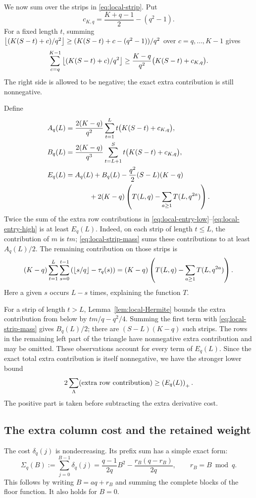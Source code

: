 We now sum over the strips in \eqref{eq:local-strip}. Put
\[
 c_{K,q}=\frac{K+q-1}{2}-(q^2-1).
\]
For a fixed length $t$, summing
$\left\lfloor (K(S-t)+c)/q^2\right\rfloor\geq(K(S-t)+c-(q^2-1))/q^2$
over $c=q,\ldots,K-1$ gives
\begin{equation}\label{eq:local-strip-mass}
 \sum_{c=q}^{K-1}\left\lfloor (K(S-t)+c)/q^2\right\rfloor
 \geq\frac{K-q}{q^2}\bigl(K(S-t)+c_{K,q}\bigr).
\end{equation}
The right side is allowed to be negative; the exact extra contribution is
still nonnegative.

Define
\begin{align*}
 A_q(L)&=\frac{2(K-q)}{q^2}\sum_{t=1}^{L}
              t\bigl(K(S-t)+c_{K,q}\bigr),\\
 B_q(L)&=\frac{2(K-q)}{q^3}\sum_{t=L+1}^{S}
              t\bigl(K(S-t)+c_{K,q}\bigr),\\
 E_q(L)&=A_q(L)+B_q(L)-\frac{q^2}{2}(S-L)(K-q)\\
 &\hspace{12mm}+2(K-q)\left(T(L,q)-\sum_{a\geq1}T(L,q^{2a})\right).
\end{align*}
Twice the sum of the extra row contributions in
\eqref{eq:local-entry-low}--\eqref{eq:local-entry-high} is at least $E_q(L)$.
Indeed, on each strip of length $t\leq L$, the contribution of $m$ is $tm$;
\eqref{eq:local-strip-mass} sums these contributions to at least $A_q(L)/2$.
The remaining contribution on those strips is
\[
 (K-q)\sum_{t=1}^{L}\sum_{s=0}^{t-1}
       \left(\left\lfloor s/q\right\rfloor-\tau_q(s)\right)
 =(K-q)\left(T(L,q)-\sum_{a\geq1}T(L,q^{2a})\right).
\]
Here a given $s$ occurs $L-s$ times, explaining the function $T$.

For a strip of length $t>L$, Lemma~\ref{lem:local-Hermite} bounds the extra
contribution from below by $tm/q-q^2/4$. Summing the first term with
\eqref{eq:local-strip-mass} gives $B_q(L)/2$; there are
$(S-L)(K-q)$ such strips. The rows in the remaining left part of the
triangle have nonnegative extra contribution and may be omitted. These
observations account for every term of $E_q(L)$. Since the exact total
extra contribution is itself nonnegative, we have the stronger lower bound
\begin{equation}\label{eq:local-extra-positive}
 2\sum_\Lambda(\text{extra row contribution})\geq\left(E_q(L)\right)_+.
\end{equation}
The positive part is taken before subtracting the extra derivative cost.

\subsection{The extra column cost and the retained weight}
The cost $\delta_q(j)$ is nondecreasing. Its prefix sum has a simple exact
form:
\begin{equation}\label{eq:small-column-prefix}
 \Sigma_q(B):=\sum_{j=0}^{B-1}\delta_q(j)
 =\frac{q-1}{2q}B^2-\frac{r_B(q-r_B)}{2q},
 \qquad r_B=B\bmod q.
\end{equation}
This follows by writing $B=aq+r_B$ and summing the complete blocks of the
floor function. It also holds for $B=0$.

